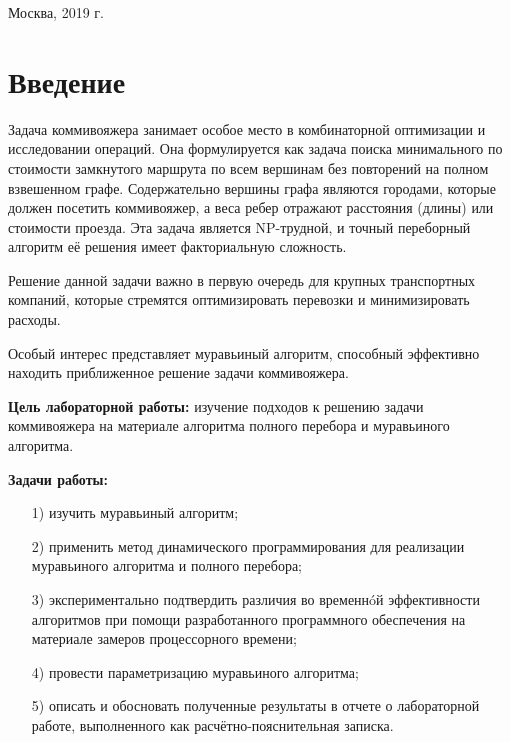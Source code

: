 \documentclass[a4paper,12pt]{article}
\begin{document}
\vspace*{40mm}
\begin{center}
Москва, 2019 г.  
\end{center}
\thispagestyle{empty}

\tableofcontents

\newpage
\section*{Введение}

Задача коммивояжера занимает особое место в комбинаторной оптимизации и 
исследовании операций. Она формулируется как задача поиска минимального по стоимости замкнутого 
маршрута по всем вершинам
без повторений на полном взвешенном графе. Содержательно вершины 
графа являются
городами, которые должен посетить коммивояжер, а веса ребер отражают расстояния 
(длины) или стоимости
проезда. Эта задача является NP-трудной, и точный переборный алгоритм её решения 
имеет факториальную
сложность. ~\cite{kom}

Решение данной задачи важно в первую очередь для крупных
транспортных компаний, которые стремятся оптимизировать перевозки
и минимизировать расходы. ~\cite{pract}

Особый интерес представляет муравьиный алгоритм,
способный эффективно находить приближенное решение задачи коммивояжера.

\textbf{Цель лабораторной работы:} изучение подходов к решению задачи коммивояжера
на материале алгоритма полного перебора и муравьиного алгоритма.

\textbf{Задачи работы:}
	
\begin{enumerate} 
\item[1)] изучить муравьиный алгоритм;
\item[2)] применить метод динамического программирования для  
реализации муравьиного алгоритма и полного перебора;
\item[3)] экспериментально подтвердить различия во временнóй эффективности алгоритмов 
при помощи разработанного программного обеспечения на материале замеров процессорного 
времени;
\item[4)] провести параметризацию муравьиного алгоритма;
\item[5)] описать и обосновать полученные результаты в отчете о лабораторной 
работе, выполненного как расчётно-пояснительная записка. 
\end{enumerate} 
\pagebreak
\end{document}
